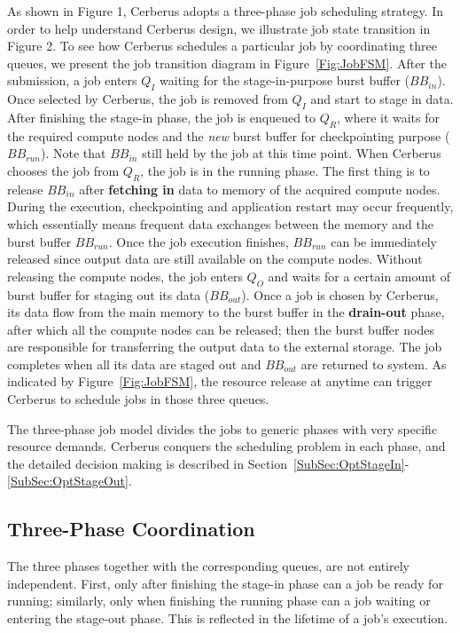 As shown in Figure 1, Cerberus adopts a three-phase job scheduling strategy. 
In order to help understand Cerberus design, we illustrate job state transition in Figure 2.
To see how Cerberus schedules a particular job by coordinating three queues,
we present the job transition diagram in Figure~\ref{Fig:JobFSM}.
After the submission, a job enters $Q_I$ waiting for the stage-in-purpose burst buffer ($BB_{in}$).
Once selected by Cerberus, the job is removed from $Q_I$ and start to stage in data.
After finishing the stage-in phase, the job is enqueued to $Q_R$,
where it waits for the required compute nodes and the \textit{new} burst buffer for checkpointing purpose ($BB_{run}$).
Note that $BB_{in}$ still held by the job at this time point. When Cerberus chooses the job from $Q_R$, the job is in the running phase.
The first thing is to release $BB_{in}$ after \textbf{fetching in} data to memory of the acquired compute nodes.
During the execution, checkpointing and application restart may occur frequently,
which essentially means frequent data exchanges between the memory and the burst buffer $BB_{run}$.
Once the job execution finishes, $BB_{run}$ can be immediately released since
output data are still available on the compute nodes.
Without releasing the compute nodes, the job enters $Q_O$ and waits for a certain amount of burst buffer for staging out its data ($BB_{out}$).
Once a job is chosen by Cerberus, its data flow from the main memory to the burst buffer
in the \textbf{drain-out} phase, after which all the compute nodes can be released;
then the burst buffer nodes are responsible for transferring the output data to the external storage.
The job completes when all its data are staged out and $BB_{out}$ are returned to system.
As indicated by Figure~\ref{Fig:JobFSM}, the resource release at anytime can trigger Cerberus
to schedule jobs in those three queues.

The three-phase job model divides the jobs to generic phases with very specific resource demands.
Cerberus conquers the scheduling problem in each phase, and the detailed decision making is described in Section~\ref{SubSec:OptStageIn}-\ref{SubSec:OptStageOut}.

\subsection{Three-Phase Coordination}
The three phases together with the corresponding queues, are not entirely independent.
First, only after finishing the stage-in phase can a job be ready for running;
similarly, only when finishing the running phase can a job waiting or entering the stage-out phase.
This is reflected in the lifetime of a job's execution.

